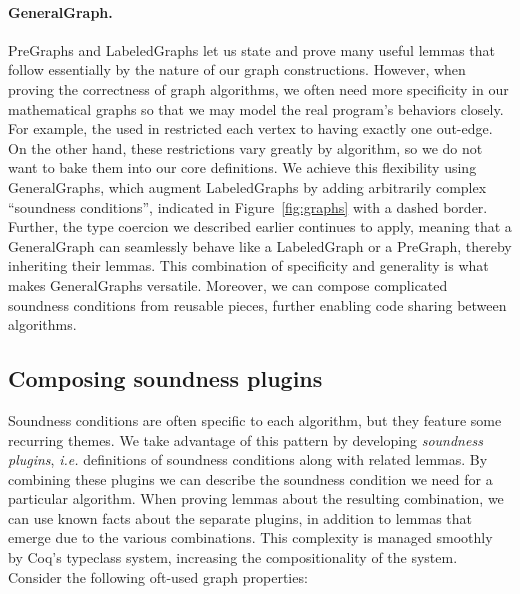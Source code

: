 
\vspace{-0.75ex}
\paragraph{GeneralGraph.}
PreGraphs and LabeledGraphs let us state
and prove many useful lemmas that follow essentially by the nature
of our graph constructions. However, when proving the correctness of graph
algorithms, we often need more specificity in our mathematical graphs
so that we may model the real program's behaviors closely.
For example, the  used in 
restricted each vertex to having exactly one out-edge.
On the other hand, these restrictions vary greatly by algorithm, so we do not
want to bake them into our core definitions.
We achieve this flexibility using GeneralGraphs, which augment
LabeledGraphs by adding arbitrarily complex ``soundness conditions'', indicated in
Figure~\ref{fig:graphs} with a dashed border.
Further, the type coercion we described earlier continues to apply,
meaning that a GeneralGraph can seamlessly behave like a
LabeledGraph or a PreGraph, thereby inheriting their lemmas.
This combination of specificity and generality is
what makes GeneralGraphs versatile. Moreover, we can
compose complicated soundness conditions from reusable pieces,
further enabling code sharing between algorithms.





\subsection{Composing soundness plugins}
\label{subsec:graphplugins}

Soundness conditions are often specific %
to each algorithm, but they feature some recurring themes.
We take advantage of this pattern by developing %
\emph{soundness plugins}, \emph{i.e.} definitions of soundness
conditions along with related lemmas.  By combining these plugins
we can describe the soundness condition we need for a particular
algorithm.  When proving lemmas about the resulting combination,
we can use known facts about the separate plugins, in addition to
lemmas that emerge due to the various combinations.  This complexity
is managed smoothly by Coq's typeclass system, increasing the
compositionality of the system.
Consider the following oft-used graph properties:

